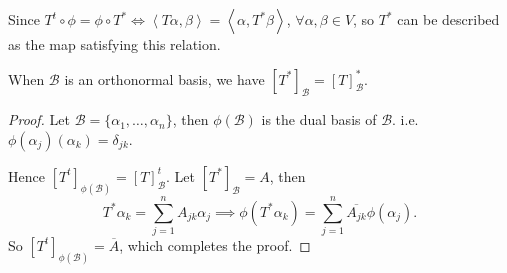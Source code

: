 Since $T^t \circ \phi = \phi \circ T^* \iff  \left<T\alpha, \beta \right>
= \left<\alpha, T^*\beta \right>$, $\forall \alpha, \beta\in V$,
so $T^*$ can be described as the map satisfying this relation.
\begin{proposition}
	When $\mathcal{B}$ is an orthonormal basis,
	we have $[T^*]_{\mathcal{B}} = [T]_{\mathcal{B}}^*$.
\end{proposition}
\begin{proof}[Proof]
    Let $\mathcal{B} = \{\alpha_1,\dots, \alpha_n\}$,
	then $\phi(\mathcal{B})$ is the dual basis of $\mathcal{B}$.
	i.e. $\phi(\alpha_j)(\alpha_k) = \delta_{jk}$.

	Hence $[T^t]_{\phi(\mathcal{B})} = [T]_{\mathcal{B}}^t$.
	Let $[T^*]_{\mathcal{B}} = A$, then
	\[
	T^*\alpha_k = \sum_{j=1}^{n} A_{jk}\alpha_j
	\implies \phi(T^*\alpha_k) = \sum_{j=1}^{n} \overline{A_{jk}}\phi(\alpha_j).
	\]
	So $[T^t]_{\phi(\mathcal{B})} = \overline{A}$, which completes the proof.
\end{proof}
